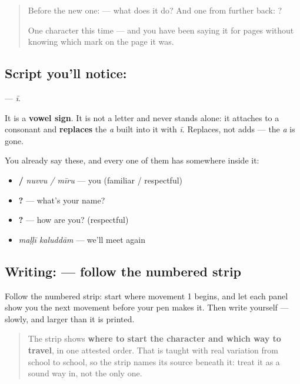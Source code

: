 \label{lesson:TE-S119-vowel-sign-ii}



\begin{quote}
Before the new one:  — what does it do? And one from further back: ?

One character this time — and you have been saying it for pages without knowing which mark on the page it was.
\end{quote}

\subsection*{Script you'll notice: }
\textbf{} — \emph{ī}.

It is a \textbf{vowel sign}. It is not a letter and never stands alone: it attaches to a consonant and \textbf{replaces} the \emph{a} built into it with \emph{ī}. Replaces, not adds — the \emph{a} is gone.

You already say these, and every one of them has  somewhere inside it:

\begin{itemize}
\raggedright
  \item \textbf{ / } \emph{nuvvu / mīru} — you (familiar / respectful)
  \item \textbf{  ?} — what's your name?
  \item \textbf{  ?} — how are you? (respectful)
  \item \textbf{ } \emph{maḷḷī kaluddām} — we'll meet again
\end{itemize}

\subsection*{Writing:  — follow the numbered strip}

Follow the numbered strip: start where movement 1 begins, and let each panel show you the next movement before your pen makes it. Then write  yourself — slowly, and larger than it is printed.

\begin{quote}
The strip shows \textbf{where to start the character and which way to travel}, in one attested order. That is taught with real variation from school to school, so the strip names its source beneath it: treat it as a sound way in, not the only one.
\end{quote}

